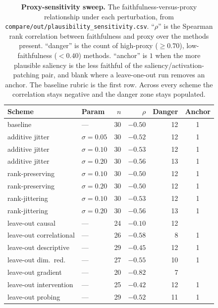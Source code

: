 \begin{table}[t]
\centering
\caption{\textbf{Proxy-sensitivity sweep.} The faithfulness-versus-proxy relationship under
each perturbation, from \texttt{compare/out/plausibility\_sensitivity.csv}. ``$\rho$'' is the
Spearman rank correlation between faithfulness and proxy over the methods present. ``danger''
is the count of high-proxy ($\geq0.70$), low-faithfulness ($<0.40$) methods. ``anchor'' is
$1$ when the more plausible saliency is the less faithful of the saliency/activation-patching
pair, and blank where a leave-one-out run removes an anchor. The baseline rubric is the first
row. Across every scheme the correlation stays negative and the danger zone stays populated.}
\label{supp:tab:plaussens}
\begin{tabular}{@{}llrrrc@{}}
\toprule
Scheme & Param & $n$ & $\rho$ & Danger & Anchor \\
\midrule
baseline                & ---           & 30 & $-0.50$ & 12 & 1 \\
additive jitter         & $\sigma=0.05$ & 30 & $-0.52$ & 12 & 1 \\
additive jitter         & $\sigma=0.10$ & 30 & $-0.53$ & 12 & 1 \\
additive jitter         & $\sigma=0.20$ & 30 & $-0.56$ & 13 & 1 \\
rank-preserving         & $\sigma=0.10$ & 30 & $-0.50$ & 12 & 1 \\
rank-preserving         & $\sigma=0.20$ & 30 & $-0.50$ & 12 & 1 \\
rank-jittering          & $\sigma=0.10$ & 30 & $-0.53$ & 12 & 1 \\
rank-jittering          & $\sigma=0.20$ & 30 & $-0.56$ & 13 & 1 \\
leave-out causal        & ---           & 24 & $-0.10$ & 12 & \\
leave-out correlational & ---           & 26 & $-0.58$ &  8 & 1 \\
leave-out descriptive   & ---           & 29 & $-0.45$ & 12 & 1 \\
leave-out dim.\ red.    & ---           & 27 & $-0.55$ & 10 & 1 \\
leave-out gradient      & ---           & 20 & $-0.82$ &  7 & \\
leave-out intervention  & ---           & 25 & $-0.42$ & 12 & 1 \\
leave-out probing       & ---           & 29 & $-0.52$ & 11 & 1 \\
\bottomrule
\end{tabular}
\end{table}
